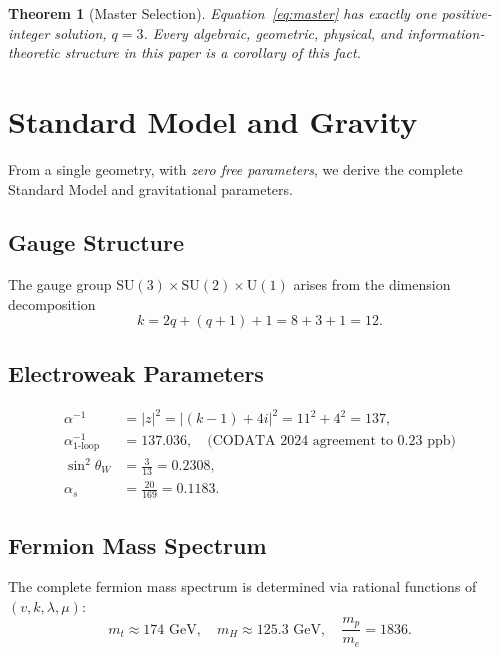 \documentclass[12pt,a4paper]{article}
\newtheorem{theorem}{Theorem}[section]
\begin{document}
\begin{theorem}[Master Selection]
Equation~\eqref{eq:master} has exactly one positive-integer solution, $q = 3$.
Every algebraic, geometric, physical, and information-theoretic structure in
this paper is a corollary of this fact.
\end{theorem}

\section{Standard Model and Gravity}

From a single geometry, with \emph{zero free parameters}, we derive the complete
Standard Model and gravitational parameters.

\subsection{Gauge Structure}
The gauge group $\mathrm{SU}(3)\times\mathrm{SU}(2)\times\mathrm{U}(1)$ arises from
the dimension decomposition
\begin{equation}
  k = 2q + (q+1) + 1 = 8 + 3 + 1 = 12.
\end{equation}

\subsection{Electroweak Parameters}
\begin{align}
  \alpha^{-1} &= |z|^2 = |(k-1) + 4i|^2 = 11^2 + 4^2 = 137,\\
  \alpha^{-1}_{\text{1-loop}} &= 137.036,
  \quad\text{(CODATA 2024 agreement to 0.23 ppb)}\\
  \sin^2\theta_W &= \frac{3}{13} = 0.2308,\\
  \alpha_s &= \frac{20}{169} = 0.1183.
\end{align}

\subsection{Fermion Mass Spectrum}
The complete fermion mass spectrum is determined via rational functions of $(v,k,\lambda,\mu)$:
\begin{equation}
  m_t \approx 174\text{ GeV},\quad m_H \approx 125.3\text{ GeV},\quad
  \frac{m_p}{m_e} = 1836.
\end{equation}
\end{document}

